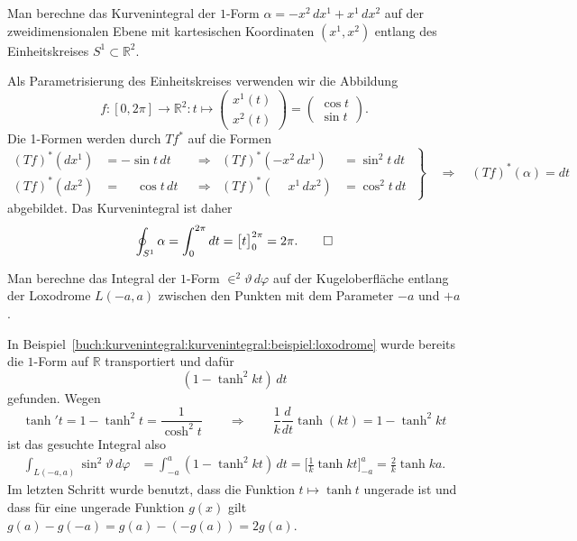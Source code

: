 \begin{beispiel}
Man berechne das Kurvenintegral der $1$-Form $\alpha=-x^2\,dx^1+x^1\,dx^2$ auf
%
der zweidimensionalen Ebene mit kartesischen Koordinaten $(x^1,x^2)$
entlang des Einheitskreises $S^1\subset\mathbb{R}^2$.
\smallskip

\noindent
Als Parametrisierung des Einheitskreises verwenden wir die Abbildung
\[
f
\colon
[0,2\pi]
\to
\mathbb{R}^2
:
t
\mapsto
\begin{pmatrix} x^1(t)\\x^2(t)\end{pmatrix}
=
\begin{pmatrix} \cos t\\\sin t\end{pmatrix}.
\]
Die 1-Formen werden durch $Tf^*$ auf die Formen
\[
\left.
\begin{aligned}
(Tf)^*(dx^1) &= -\sin t\,dt           &&\Rightarrow& (Tf)^*(-x^2\,dx^1) &= \sin^2 t\,dt\\
(Tf)^*(dx^2) &= \phantom{-}\cos t\,dt &&\Rightarrow& (Tf)^*(\phantom{-} x^1\,dx^2) &= \cos^2 t\,dt
\end{aligned}
\;
\right\}
\quad\Rightarrow\quad
(Tf)^*(\alpha)
=
dt
\]
abgebildet.
Das Kurvenintegral ist daher
\[
\oint_{S^1} \alpha
=
\int_0^{2\pi} dt
=
\bigl[
t
\bigr]_0^{2\pi}
=
2\pi.
\qedhere
\]
\end{beispiel}

\begin{beispiel}
Man berechne das Integral der $1$-Form $\in^2\vartheta\,d\varphi$ auf
der Kugeloberfläche entlang der Loxodrome $L(-a,a)$ zwischen den Punkten
mit dem Parameter $-a$ und $+a$.
\smallskip

\noindent
In Beispiel~\ref{buch:kurvenintegral:kurvenintegral:beispiel:loxodrome}
wurde bereits die $1$-Form auf $\mathbb{R}$ transportiert und dafür
\[
(1-\tanh^2 kt)\,dt
\]
gefunden.
Wegen
\[
\tanh' t
=
1-\tanh^2 t
=
\frac{1}{\cosh^2 t}
\qquad\Rightarrow\qquad
\frac{1}{k}
\frac{d}{dt}
\tanh(kt)
=
1-\tanh^2 kt
\]
ist das gesuchte Integral also
\begin{align*}
\int_{L(-a,a)} \sin^2\vartheta\,d\varphi
&=
\int_{-a}^a
(1-\tanh^2 kt)
\,dt
=
\biggl[
\frac{1}k
\tanh kt
\biggr]_{-a}^a
=\frac{2}{k} \tanh ka.
\end{align*}
Im letzten Schritt wurde benutzt, dass die Funktion $t\mapsto \tanh t$
ungerade ist und dass für eine ungerade Funktion $g(x)$ gilt
$g(a)-g(-a)= g(a)-(-g(a))=2g(a)$.
\end{beispiel}

